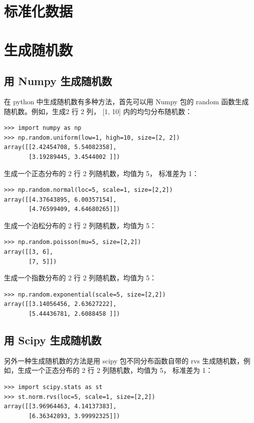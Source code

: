 \section{标准化数据}

\section{生成随机数}

\subsection{用 Numpy 生成随机数}
在 python 中生成随机数有多种方法，首先可以用 Numpy 包的 random 函数生成随机数。例如，生成2 行 2 列， [1, 10] 内的均匀分布随机数：

\begin{lstlisting}[Language=Python]
>>> import numpy as np
>>> np.random.uniform(low=1, high=10, size=[2, 2])
array([[2.42454708, 5.54082358],
       [3.19289445, 3.4544002 ]])
\end{lstlisting}

生成一个正态分布的 2 行 2 列随机数，均值为 5， 标准差为 1：

\begin{lstlisting}[Language=Python]
>>> np.random.normal(loc=5, scale=1, size=[2,2])
array([[4.37643895, 6.00357154],
       [4.76599409, 4.64680265]])
\end{lstlisting}

生成一个泊松分布的 2 行 2 列随机数，均值为 5：

\begin{lstlisting}[Language=Python]
>>> np.random.poisson(mu=5, size=[2,2])
array([[3, 6],
       [7, 5]])
\end{lstlisting}


生成一个指数分布的 2 行 2 列随机数，均值为 5：

\begin{lstlisting}[Language=Python]
>>> np.random.exponential(scale=5, size=[2,2])
array([[3.14056456, 2.63627222],
       [5.44436781, 2.6088458 ]])
\end{lstlisting}

\subsection{用 Scipy 生成随机数}
另外一种生成随机数的方法是用 scipy 包不同分布函数自带的 rvs 生成随机数，例如，生成一个正态分布的 2 行 2 列随机数，均值为 5， 标准差为 1：

\begin{lstlisting}[Language=Python]
>>> import scipy.stats as st
>>> st.norm.rvs(loc=5, scale=1, size=[2,2])
array([[3.96964463, 4.14137383],
       [6.36342893, 3.99992325]])
\end{lstlisting}

